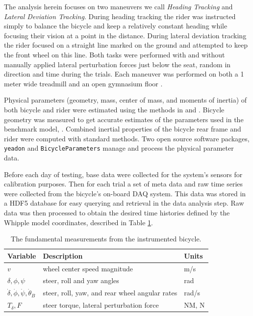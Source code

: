 \documentclass[a4paper]{article}
\begin{document}
The analysis herein focuses on two maneuvers we call \emph{Heading Tracking}
and \emph{Lateral Deviation Tracking}. During heading tracking the rider was
instructed simply to balance the bicycle and keep a relatively constant heading
while focusing their vision at a point in the distance. During lateral
deviation tracking the rider focused on a straight line marked on the ground
and attempted to keep the front wheel on this line. Both tasks were performed
with and without manually applied lateral perturbation forces just below the
seat, random in direction and time during the trials. Each maneuver was
performed on both a 1 meter wide treadmill and an open gymnasium
floor \cite{Moore2012}.

Physical parameters (geometry, mass, center of mass, and moments of inertia) of
both bicycle and rider were estimated using the methods in \cite{Moore2012} and
\cite{Yeadon1990}. Bicycle geometry was measured to get accurate estimates of
the parameters used in the benchmark model, \cite{Meijaard2007}. Combined
inertial properties of the bicycle rear frame and rider were computed with
standard methods. Two open source software packages, \verb|yeadon|
\cite{Dembia2011} and \verb|BicycleParameters| \cite{Moore2011a} manage and
process the physical parameter data.

Before each day of testing, base data were collected for the system's sensors
for calibration purposes. Then for each trial a set of meta data and raw time
series were collected from the bicycle's on-board DAQ system. This data was
stored in a HDF5 database for easy querying and retrieval in the data analysis
step. Raw data was then processed to obtain the desired time histories defined
by the Whipple model coordinates, described in Table \ref{tab:measurements}.

\begin{table}
  \centering
  \caption{The fundamental measurements from the instrumented bicycle.}
  \begin{tabular}{lll}
    \toprule
    Variable                                            & Description                                    & Units \\
    \midrule
    $v$                                                 & wheel center speed magnitude                   & m/s   \\
    $\delta,\phi,\psi$                                  & steer, roll and yaw angles                     & rad   \\
    $\dot{\delta},\dot{\phi},\dot{\psi},\dot{\theta}_B$ & steer, roll, yaw, and rear wheel angular rates & rad/s \\
    $T_\delta,F$                                        & steer torque, lateral perturbation force       & NM, N \\
    \bottomrule
  \end{tabular}
  \label{tab:measurements}
\end{table}
\end{document}
